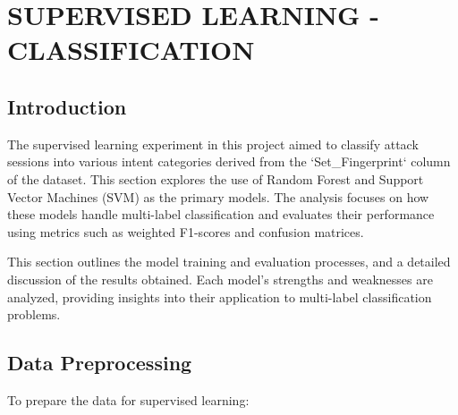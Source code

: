 

\section{SUPERVISED LEARNING - CLASSIFICATION}


    \subsection{Introduction}
    
        The supervised learning experiment in this project aimed to classify attack sessions into various intent categories derived from the `Set\_Fingerprint` column of the dataset. This section explores the use of Random Forest and Support Vector Machines (SVM) as the primary models. The analysis focuses on how these models handle multi-label classification and evaluates their performance using metrics such as weighted F1-scores and confusion matrices.

        This section outlines the model training and evaluation processes, and a detailed discussion of the results obtained. Each model's strengths and weaknesses are analyzed, providing insights into their application to multi-label classification problems.

    \subsection{Data Preprocessing}
    
    
        To prepare the data for supervised learning:

